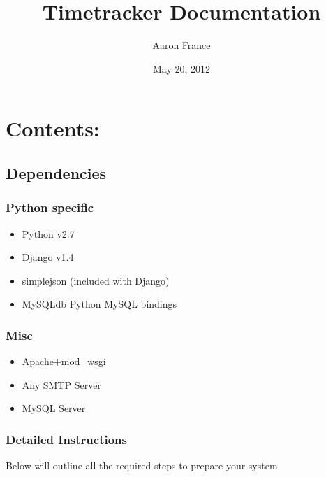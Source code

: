 \documentclass[letterpaper,10pt,english]{sphinxmanual}
\title{Timetracker Documentation}
\date{May 20, 2012}
\author{Aaron France}
\begin{document}
\maketitle
\tableofcontents
{}\label{index::doc}



\chapter{Contents:}
\label{index:contents}\label{index:welcome-to-timetracker-s-documentation}

\section{Dependencies}
\label{deps:dependencies}\label{deps::doc}

\subsection{Python specific}
\label{deps:python-specific}\begin{itemize}
\item {} 
Python v2.7

\item {} 
Django v1.4

\item {} 
simplejson (included with Django)

\item {} 
MySQLdb Python MySQL bindings

\end{itemize}


\subsection{Misc}
\label{deps:misc}\begin{itemize}
\item {} 
Apache+mod\_wsgi

\item {} 
Any SMTP Server

\item {} 
MySQL Server

\end{itemize}


\subsection{Detailed Instructions}
\label{deps:detailed-instructions}
Below will outline all the required steps to prepare your system.
\end{document}
